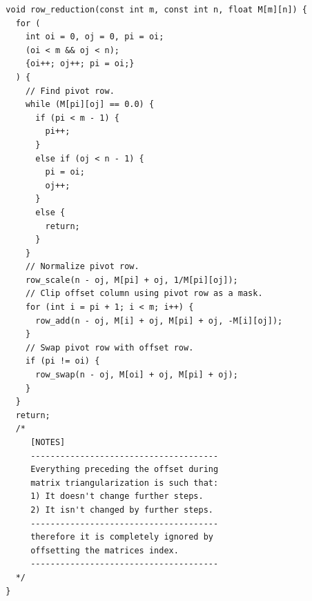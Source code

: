 \begin{verbatim}
  void row_reduction(const int m, const int n, float M[m][n]) {
    for (
      int oi = 0, oj = 0, pi = oi;
      (oi < m && oj < n);
      {oi++; oj++; pi = oi;}
    ) {
      // Find pivot row.
      while (M[pi][oj] == 0.0) {
        if (pi < m - 1) {
          pi++;
        }
        else if (oj < n - 1) {
          pi = oi;
          oj++;
        }
        else {
          return;
        }
      }
      // Normalize pivot row.
      row_scale(n - oj, M[pi] + oj, 1/M[pi][oj]);
      // Clip offset column using pivot row as a mask.
      for (int i = pi + 1; i < m; i++) {
        row_add(n - oj, M[i] + oj, M[pi] + oj, -M[i][oj]);
      }
      // Swap pivot row with offset row.
      if (pi != oi) {
        row_swap(n - oj, M[oi] + oj, M[pi] + oj);
      }
    }
    return;
    /*
       [NOTES]
       --------------------------------------
       Everything preceding the offset during
       matrix triangularization is such that:
       1) It doesn't change further steps.
       2) It isn't changed by further steps.
       --------------------------------------
       therefore it is completely ignored by
       offsetting the matrices index.
       --------------------------------------
    */
  }
\end{verbatim}
